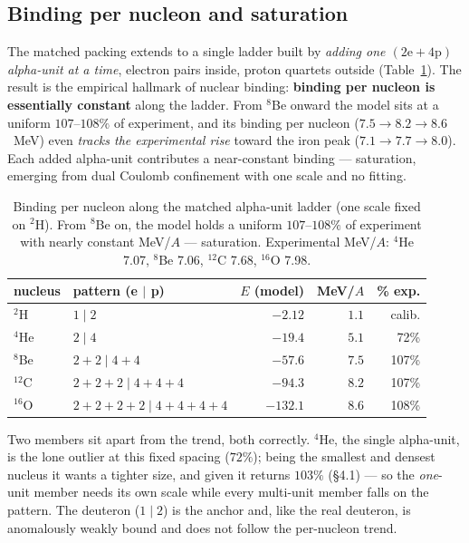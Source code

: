 \documentclass[11pt]{article}
\begin{document}
\subsection{Binding per nucleon and saturation}
\label{sec:perA}

The matched packing extends to a single ladder built by \emph{adding one
$(\mathrm{2e}+\mathrm{4p})$ alpha-unit at a time}, electron pairs inside, proton quartets
outside (Table~\ref{tab:perA}). The result is the empirical hallmark of nuclear binding:
\textbf{binding per nucleon is essentially constant} along the ladder. From $^8$Be onward the
model sits at a uniform $107$--$108\%$ of experiment, and its binding per nucleon
($7.5\to8.2\to8.6$~MeV) even \emph{tracks the experimental rise} toward the iron peak
($7.1\to7.7\to8.0$). Each added alpha-unit contributes a near-constant binding --- saturation,
emerging from dual Coulomb confinement with one scale and no fitting.

\begin{table}[t]
\centering
\begin{tabular}{llrrr}
\toprule
nucleus & pattern (e $\mid$ p) & $E$ (model) & MeV/$A$ & \% exp.\\
\midrule
$^2$H   & $1\mid 2$                              & $-2.12$ & $1.1$  & calib.\\
$^4$He  & $2\mid 4$                              & $-19.4$ & $5.1$  & 72\%\\
$^8$Be  & $2{+}2\mid 4{+}4$                      & $-57.6$ & $7.5$  & 107\%\\
$^{12}$C& $2{+}2{+}2\mid 4{+}4{+}4$              & $-94.3$ & $8.2$  & 107\%\\
$^{16}$O& $2{+}2{+}2{+}2\mid 4{+}4{+}4{+}4$      & $-132.1$& $8.6$  & 108\%\\
\bottomrule
\end{tabular}
\caption{Binding per nucleon along the matched alpha-unit ladder (one scale fixed on
$^2$H). From $^8$Be on, the model holds a uniform $107$--$108\%$ of experiment with nearly
constant MeV/$A$ --- saturation. Experimental MeV/$A$: $^4$He 7.07, $^8$Be 7.06, $^{12}$C 7.68,
$^{16}$O 7.98.}
\label{tab:perA}
\end{table}

Two members sit apart from the trend, both correctly. $^4$He, the single alpha-unit, is the
lone outlier at this fixed spacing ($72\%$); being the smallest and densest nucleus it wants a
tighter size, and given it returns $103\%$ (\S4.1) --- so the \emph{one}-unit member needs its
own scale while every multi-unit member falls on the pattern. The deuteron ($1\mid2$) is the
anchor and, like the real deuteron, is anomalously weakly bound and does not follow the
per-nucleon trend.
\end{document}
